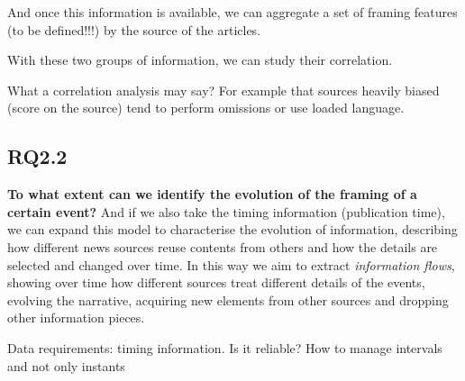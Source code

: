And once this information is available, we can aggregate a set of framing features (to be defined!!!) by the source of the articles.

With these two groups of information, we can study their correlation.

What a correlation analysis may say? For example that sources heavily biased (score on the source) tend to perform omissions or use loaded language.




\subsection{RQ2.2}
\textbf{To what extent can we identify the evolution of the framing of a certain event?}
And if we also take the timing information (publication time), we can expand this model to characterise the evolution of information, describing how different news sources reuse contents from others and how the details are selected and changed over time.
In this way we aim to extract \textit{information flows}, showing over time how different sources treat different details of the events, evolving the narrative, acquiring new elements from other sources and dropping other information pieces.\textbf{}

Data requirements: timing information.
Is it reliable? How to manage intervals and not only instants







